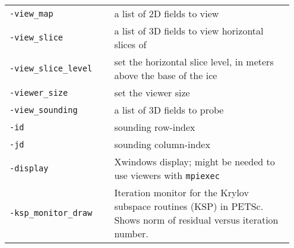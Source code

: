 \documentclass[landscape]{article}
\begin{document}
\begin{textblock}{15}
\begin{tabular}{@{}p{0.35\linewidth}p{0.6\linewidth}@{}}
\texttt{-view_map} & a list of 2D fields to view\\
\texttt{-view_slice} & a list of 3D fields to view horizontal slices of\\
\texttt{-view_slice_level} & set the horizontal slice level, in meters above
the base of the ice\\
\texttt{-viewer_size} & set the viewer size \\
\texttt{-view_sounding} & a list of 3D fields to probe\\
\texttt{-id} & sounding row-index\\
\texttt{-jd} & sounding column-index\\
\texttt{-display} & Xwindows display; might be needed to use viewers with \texttt{mpiexec}\\
\texttt{-ksp_monitor_draw} & Iteration monitor for the Krylov subspace routines (KSP) 
in PETSc. Shows norm of residual versus iteration number.
\end{tabular}

\end{textblock}
\end{document}
